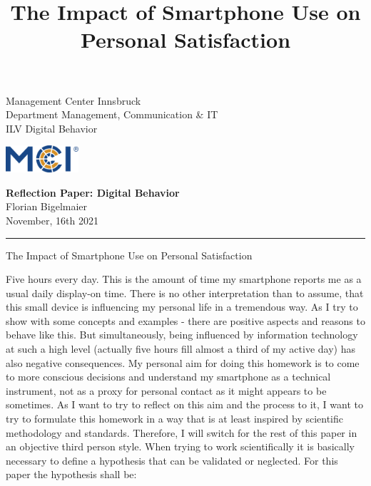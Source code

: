 \documentclass[11pt,a4paper]{article}
\newcommand{\fontsmall}{\fontsize{7pt}{10pt}\selectfont}
\newcommand{\fontnormal}{\fontsize{11pt}{16pt}\selectfont}
\newcommand{\headline}{\fontsize{17pt}{26pt}\selectfont}
\begin{document}
   \title{The Impact of Smartphone Use on Personal Satisfaction} 



\noindent\begin{minipage}{0.5\textwidth}
\fontsmall
Management Center Innsbruck \\
Department Management, Communication \& IT  \\
ILV Digital Behavior


\end{minipage}%
\hfill%
\begin{minipage}{0.3\textwidth}\raggedleft
\includegraphics[height=1.0cm]{mci-logo.png}

\end{minipage}


 
\begin{center}
\textbf{Reflection Paper: Digital Behavior}\\   %
Florian Bigelmaier\\                         %
November, 16th 2021\\                         %
\end{center}
\rule{\linewidth}{0.1mm}



\headline \begin{center}
The Impact of Smartphone Use on Personal Satisfaction
\end{center} 
\fontnormal 
Five hours every day. This is the amount of time my smartphone reports me as a usual daily display-on time. There is no other interpretation than to assume, that this small device is influencing my personal life in a tremendous way. As I try to show with some concepts and examples - there are positive aspects and reasons to behave like this. But simultaneously, being influenced by information technology at such a high level (actually five hours fill almost a third of my active day) has also negative consequences. My personal aim for doing this homework is to come to more conscious decisions and understand my smartphone as a technical instrument, not as a proxy for personal contact as it might appears to be sometimes. As I want to try to reflect on this aim and the process to it, I want to try to formulate this homework in a way that is at least inspired by scientific methodology and standards. Therefore, I will switch for the rest of this paper in an objective third person style. When trying to work scientifically it is basically necessary to define a hypothesis that can be validated or neglected. For this paper the hypothesis shall be:
\end{document}

